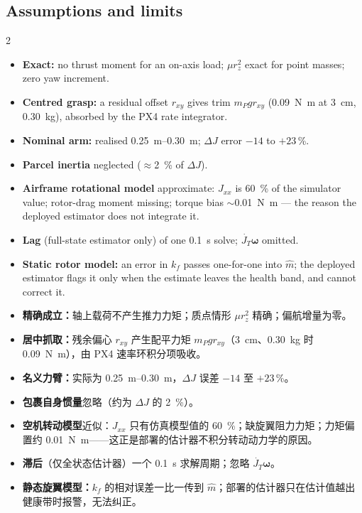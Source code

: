 \documentclass[10pt,a4paper]{article}
\numberwithin{equation}{section}
\newcommand{\dJ}{\Delta J}
\newcommand{\mP}{m_P}
\newcommand{\Jt}{J_T}
\newcommand{\pair}[2]{\begin{paracol}{2}#1\switchcolumn #2\end{paracol}}
\newcommand{\bsub}[2]{\needspace{8\baselineskip}\subsection{#1\quad{\normalfont #2}}}
\begin{document}
\bsub{Assumptions and limits}{假设与局限}
\pair{\begin{itemize}\setlength\itemsep{1pt}
\item \textbf{Exact:} no thrust moment for an on-axis load; $\mu r_z^2$ exact for point masses; zero yaw increment.
\item \textbf{Centred grasp:} a residual offset $r_{xy}$ gives trim $\mP g r_{xy}$ (\SI{0.09}{\newton\meter} at \SI{3}{\centi\meter}, \SI{0.30}{\kg}), absorbed by the PX4 rate integrator.
\item \textbf{Nominal arm:} realised \SIrange{0.25}{0.30}{\meter}; $\dJ$ error $-14$ to $+23$\,\%.
\item \textbf{Parcel inertia} neglected ($\approx$\SI{2}{\percent} of $\dJ$).
\item \textbf{Airframe rotational model} approximate: $J_{xx}$ is \SI{60}{\percent} of the simulator value; rotor-drag moment missing; torque bias $\sim$\SI{0.01}{\newton\meter} --- the reason the deployed estimator does not integrate it.
\item \textbf{Lag} (full-state estimator only) of one \SI{0.1}{\second} solve; $\dot{\Jt}\bm\omega$ omitted.
\item \textbf{Static rotor model:} an error in $k_f$ passes one-for-one into $\hat m$; the deployed estimator flags it only when the estimate leaves the health band, and cannot correct it.
\end{itemize}}
{\begin{itemize}\setlength\itemsep{1pt}
\item \textbf{精确成立：}轴上载荷不产生推力力矩；质点情形 $\mu r_z^2$ 精确；偏航增量为零。
\item \textbf{居中抓取：}残余偏心 $r_{xy}$ 产生配平力矩 $\mP g r_{xy}$（\SI{3}{\centi\meter}、\SI{0.30}{\kg} 时 \SI{0.09}{\newton\meter}），由 PX4 速率环积分项吸收。
\item \textbf{名义力臂：}实际为 \SIrange{0.25}{0.30}{\meter}，$\dJ$ 误差 $-14$ 至 $+23$\,\%。
\item \textbf{包裹自身惯量}忽略（约为 $\dJ$ 的 \SI{2}{\percent}）。
\item \textbf{空机转动模型}近似：$J_{xx}$ 只有仿真模型值的 \SI{60}{\percent}；缺旋翼阻力力矩；力矩偏置约 \SI{0.01}{\newton\meter}——这正是部署的估计器不积分转动动力学的原因。
\item \textbf{滞后}（仅全状态估计器）一个 \SI{0.1}{\second} 求解周期；忽略 $\dot{\Jt}\bm\omega$。
\item \textbf{静态旋翼模型：}$k_f$ 的相对误差一比一传到 $\hat m$；部署的估计器只在估计值越出健康带时报警，无法纠正。
\end{itemize}}
\end{document}
